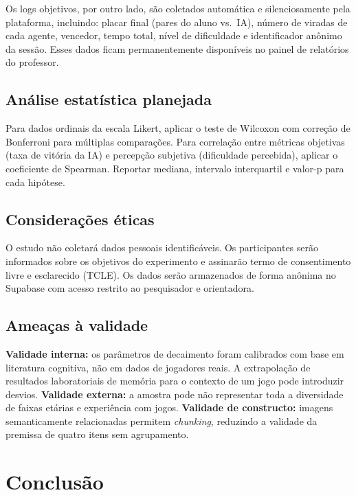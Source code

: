 \documentclass[
    12pt,
    openright,
    twoside,
    a4paper,
    english,
    brazil
]{abntex2}
\begin{document}
Os logs objetivos, por outro lado, são coletados automática e silenciosamente pela plataforma, incluindo: placar final (pares do aluno vs.\ IA), número de viradas de cada agente, vencedor, tempo total, nível de dificuldade e identificador anônimo da sessão. Esses dados ficam permanentemente disponíveis no painel de relatórios do professor.

\section{Análise estatística planejada}

Para dados ordinais da escala Likert, aplicar o teste de Wilcoxon com correção de Bonferroni para múltiplas comparações. Para correlação entre métricas objetivas (taxa de vitória da IA) e percepção subjetiva (dificuldade percebida), aplicar o coeficiente de Spearman. Reportar mediana, intervalo interquartil e valor-p para cada hipótese.

\section{Considerações éticas}

O estudo não coletará dados pessoais identificáveis. Os participantes serão informados sobre os objetivos do experimento e assinarão termo de consentimento livre e esclarecido (TCLE). Os dados serão armazenados de forma anônima no Supabase com acesso restrito ao pesquisador e orientadora.

\section{Ameaças à validade}

\textbf{Validade interna:} os parâmetros de decaimento foram calibrados com base em literatura cognitiva, não em dados de jogadores reais. A extrapolação de resultados laboratoriais de memória para o contexto de um jogo pode introduzir desvios. \textbf{Validade externa:} a amostra pode não representar toda a diversidade de faixas etárias e experiência com jogos. \textbf{Validade de constructo:} imagens semanticamente relacionadas permitem \textit{chunking}, reduzindo a validade da premissa de quatro itens sem agrupamento.

\chapter{Conclusão}
\end{document}
